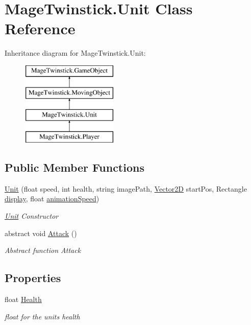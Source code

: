 \hypertarget{class_mage_twinstick_1_1_unit}{}\section{Mage\+Twinstick.\+Unit Class Reference}
\label{class_mage_twinstick_1_1_unit}
Inheritance diagram for Mage\+Twinstick.\+Unit\+:\begin{figure}[H]
\begin{center}
\leavevmode
\includegraphics[height=4.000000cm]{class_mage_twinstick_1_1_unit}
\end{center}
\end{figure}
\subsection*{Public Member Functions}
\begin{DoxyCompactItemize}
\item 
\hyperlink{class_mage_twinstick_1_1_unit_a857d0f6e0f55b4c81e2a3bbf8711dd18}{Unit} (float speed, int health, string image\+Path, \hyperlink{class_mage_twinstick_1_1_vector2_d}{Vector2\+D} start\+Pos, Rectangle \hyperlink{class_mage_twinstick_1_1_game_object_a5807df7f837dc87c8955a008d0b27b50}{display}, float \hyperlink{class_mage_twinstick_1_1_game_object_a5d21c31402c27c5a19f2a62d98720456}{animation\+Speed})
\begin{DoxyCompactList}\small\item\em \hyperlink{class_mage_twinstick_1_1_unit}{Unit} Constructor \end{DoxyCompactList}\item 
abstract void \hyperlink{class_mage_twinstick_1_1_unit_a98b69920e6c6c09c5cfaacbf42a31bbf}{Attack} ()
\begin{DoxyCompactList}\small\item\em Abstract function Attack \end{DoxyCompactList}\end{DoxyCompactItemize}
\subsection*{Properties}
\begin{DoxyCompactItemize}
\item 
float \hyperlink{class_mage_twinstick_1_1_unit_af7e080c507d33af04d6d1e8abc665047}{Health}
\begin{DoxyCompactList}\small\item\em float for the units health \end{DoxyCompactList}\end{DoxyCompactItemize}

